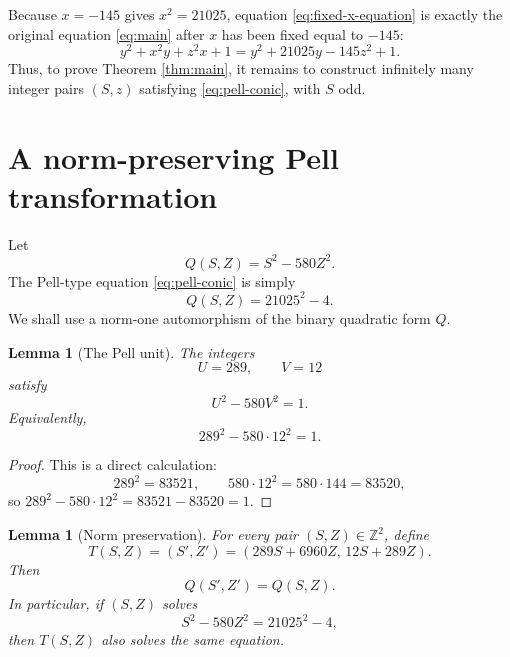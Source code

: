 \documentclass[11pt]{article}
\numberwithin{equation}{section}
\newtheorem{lemma}[theorem]{Lemma}
\newcommand{\Z}{\mathbb Z}
\begin{document}
Because $x=-145$ gives $x^2=21025$, equation \eqref{eq:fixed-x-equation} is
exactly the original equation \eqref{eq:main} after $x$ has been fixed equal to
$-145$:
\begin{equation*}
        y^2+x^2y+z^2x+1
        =y^2+21025y-145z^2+1.
\end{equation*}
Thus, to prove Theorem \ref{thm:main}, it remains to construct infinitely many
integer pairs $(S,z)$ satisfying \eqref{eq:pell-conic}, with $S$ odd.

\section{A norm-preserving Pell transformation}

Let
\begin{equation}\label{eq:Q-def}
        Q(S,Z)=S^2-580Z^2.
\end{equation}
The Pell-type equation \eqref{eq:pell-conic} is simply
\begin{equation*}
        Q(S,Z)=21025^2-4.
\end{equation*}
We shall use a norm-one automorphism of the binary quadratic form $Q$.

\begin{lemma}[The Pell unit]\label{lem:unit}
The integers
\begin{equation*}
        U=289,
        \qquad
        V=12
\end{equation*}
satisfy
\begin{equation}\label{eq:unit}
        U^2-580V^2=1.
\end{equation}
Equivalently,
\begin{equation*}
        289^2-580\cdot 12^2=1.
\end{equation*}
\end{lemma}

\begin{proof}
This is a direct calculation:
\begin{equation*}
        289^2=83521,
        \qquad
        580\cdot 12^2=580\cdot 144=83520,
\end{equation*}
so $289^2-580\cdot 12^2=83521-83520=1$.
\end{proof}

\begin{lemma}[Norm preservation]\label{lem:norm-preserve}
For every pair $(S,Z)\in\Z^2$, define
\begin{equation}\label{eq:T-def}
        T(S,Z)=(S',Z')=(289S+6960Z,\,12S+289Z).
\end{equation}
Then
\begin{equation}\label{eq:Q-preserved}
        Q(S',Z')=Q(S,Z).
\end{equation}
In particular, if $(S,Z)$ solves
\begin{equation*}
        S^2-580Z^2=21025^2-4,
\end{equation*}
then $T(S,Z)$ also solves the same equation.
\end{lemma}
\end{document}
